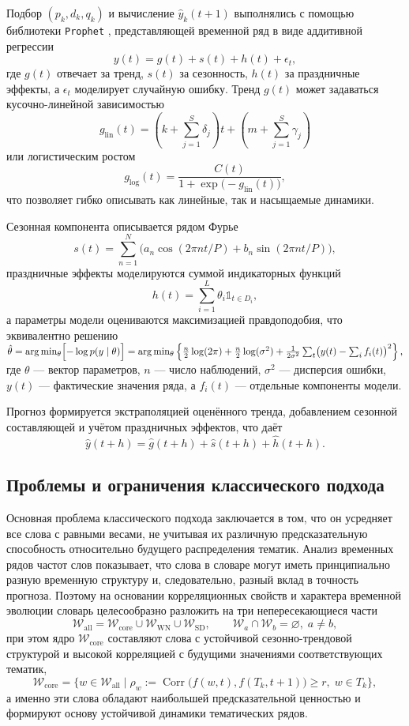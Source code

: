 \documentclass[14pt,a4paper]{article}
\begin{document}
Подбор $(p_k,d_k,q_k)$ и вычисление $\widehat{y}_k(t+1)$ выполнялись с помощью библиотеки \texttt{Prophet} \cite{prophet}, представляющей временной ряд в виде аддитивной регрессии
\[
y(t)=g(t)+s(t)+h(t)+\epsilon_t,
\]
где $g(t)$ отвечает за тренд, $s(t)$ за сезонность, $h(t)$ за праздничные эффекты, а $\epsilon_t$ моделирует случайную ошибку. Тренд $g(t)$ может задаваться кусочно-линейной зависимостью
\[
g_{\text{lin}}(t)=(k+\sum_{j=1}^{S}\delta_j)t+(m+\sum_{j=1}^{S}\gamma_j)
\]
или логистическим ростом
\[
g_{\text{log}}(t)=\frac{C(t)}{1+\exp\!\bigl(-g_{\text{lin}}(t)\bigr)},
\]
что позволяет гибко описывать как линейные, так и насыщаемые динамики.

Сезонная компонента описывается рядом Фурье 
\[
s(t)=\sum_{n=1}^{N}\bigl(a_n\cos(2\pi n t/P)+b_n\sin(2\pi n t/P)\bigr),
\]
праздничные эффекты моделируются суммой индикаторных функций
\[
h(t)=\sum_{i=1}^{L}\theta_i\mathbb 1_{t\in D_i},
\]
а параметры модели оцениваются максимизацией правдоподобия, что эквивалентно решению
\(
\hat{\theta}=\arg\min_{\theta}\Bigl[-\log p(y\mid\theta)\Bigr]=\arg\min_{\theta}\left\{\tfrac{n}{2}\log(2\pi)+\tfrac{n}{2}\log(\sigma^{2})+\tfrac{1}{2\sigma^{2}}\sum_{t}\bigl(y(t)-\sum_{i}f_i(t)\bigr)^{2}\right\},
\)
где $\theta$ — вектор параметров, $n$ — число наблюдений, $\sigma^{2}$ — дисперсия ошибки, $y(t)$ — фактические значения ряда, а $f_i(t)$ — отдельные компоненты модели.

Прогноз формируется экстраполяцией оценённого тренда, добавлением сезонной составляющей и учётом праздничных эффектов, что даёт
\[
\hat{y}(t+h)=\hat{g}(t+h)+\hat{s}(t+h)+\hat{h}(t+h).
\]


\newpage
\subsection{Проблемы и ограничения классического подхода}\label{ssec:limits}
Основная проблема классического подхода заключается в том, что он усредняет все слова с равными весами, не учитывая их различную предсказательную способность относительно будущего распределения тематик. Анализ временных рядов частот слов показывает, что слова в словаре могут иметь принципиально разную временную структуру и, следовательно, разный вклад в точность прогноза. Поэтому на основании корреляционных свойств и характера временной эволюции словарь целесообразно разложить на три непересекающиеся части 
\[
\mathcal{W}_{\mathrm{all}}=\mathcal{W}_{\mathrm{core}}\cup\mathcal{W}_{\mathrm{WN}}\cup\mathcal{W}_{\mathrm{SD}},\qquad \mathcal{W}_{a}\cap\mathcal{W}_{b}=\varnothing,\;a\neq b,
\]
при этом ядро $\mathcal{W}_{\mathrm{core}}$ составляют слова с устойчивой сезонно-трендовой структурой и высокой корреляцией с будущими значениями соответствующих тематик,
\[
\mathcal{W}_{\mathrm{core}}=\bigl\{w\in\mathcal{W}_{\mathrm{all}}\mid \rho_w:=\operatorname{Corr}\bigl(f(w,t),f(T_k,t+1)\bigr)\ge r,\;w\in T_k\bigr\},
\]
а именно эти слова обладают наибольшей предсказательной ценностью и формируют основу устойчивой динамики тематических рядов.
\end{document}
